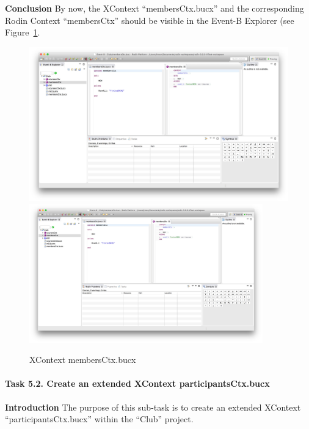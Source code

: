 \textbf{Conclusion} By now, the XContext ``membersCtx.bucx'' and the corresponding Rodin Context ``membersCtx'' should be visible in the Event-B Explorer (see Figure~\ref{fig:membersCtx}.
  \begin{figure}[!htbp]
    \centering
    \ifplastex
    \includegraphics[width=512]{figures/MembersCtx}
    \else
    \includegraphics[width=0.9\textwidth]{figures/MembersCtx}
    \fi
    \caption{XContext membersCtx.bucx}
    \label{fig:membersCtx}
  \end{figure}

\paragraph{Task 5.2. Create an extended XContext participantsCtx.bucx}
\textbf{Introduction} The purpose of this sub-task is to create an extended XContext ``participantsCtx.bucx'' within the ``Club'' project.


